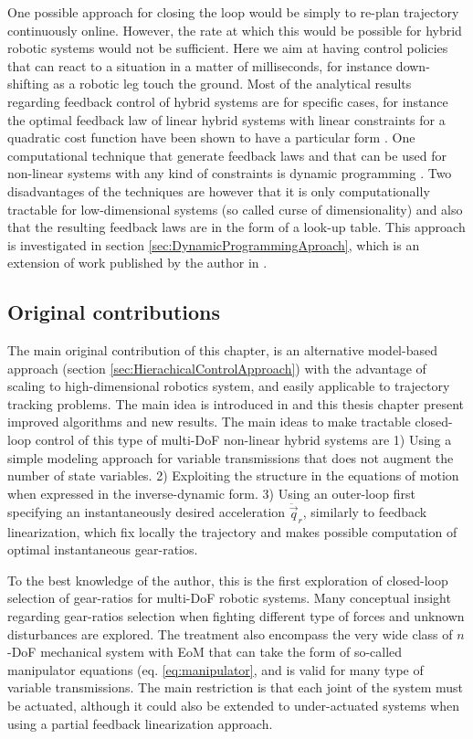 One possible approach for closing the loop would be simply to re-plan trajectory continuously online. However, the rate at which this would be possible for hybrid robotic systems would not be sufficient. Here we aim at having control policies that can react to a situation in a matter of milliseconds, for instance down-shifting as a robotic leg touch the ground. Most of the analytical results regarding feedback control of hybrid systems are for specific cases, for instance the optimal feedback law of linear hybrid systems with linear constraints for a quadratic cost function have been shown to have a particular form \cite{borrelli_dynamic_2005}. One computational technique that generate feedback laws and that can be used for non-linear systems with any kind of constraints is dynamic programming \cite{donald_e._kirk_optimal_2004}. Two disadvantages of the techniques are however that it is only computationally tractable for low-dimensional systems (so called curse of dimensionality) and also that the resulting feedback laws are in the form of a look-up table. This approach is investigated in section \ref{sec:DynamicProgrammingAproach}, which is an extension of work published by the author in \cite{girard_practical_2016}.

\subsection{Original contributions}
\label{sec:maincont}

The main original contribution of this chapter, is an alternative model-based approach (section \ref{sec:HierachicalControlApproach}) with the advantage of scaling to high-dimensional robotics system, and easily applicable to trajectory tracking problems. The main idea is introduced in \cite{girard_leveraging_2017} and this thesis chapter present improved algorithms and new results. The main ideas to make tractable closed-loop control of this type of multi-DoF non-linear hybrid systems are 1) Using a simple modeling approach for variable transmissions that does not augment the number of state variables. 2) Exploiting the structure in the equations of motion when expressed in the inverse-dynamic form.  3) Using an outer-loop first specifying an instantaneously desired acceleration $\ddot{\vec{q}}_r$, similarly to feedback linearization, which fix locally the trajectory and makes possible computation of optimal instantaneous gear-ratios.

To the best knowledge of the author, this is the first exploration of closed-loop selection of gear-ratios for multi-DoF robotic systems. Many conceptual insight regarding gear-ratios selection when fighting different type of forces and unknown disturbances are explored. The treatment also encompass the very wide class of $n$-DoF mechanical system with EoM that can take the form of so-called manipulator equations (eq. \eqref{eq:manipulator}, and is valid for many type of variable transmissions. The main restriction is that each joint of the system must be actuated, although it could also be extended to under-actuated systems when using a partial feedback linearization approach. 



